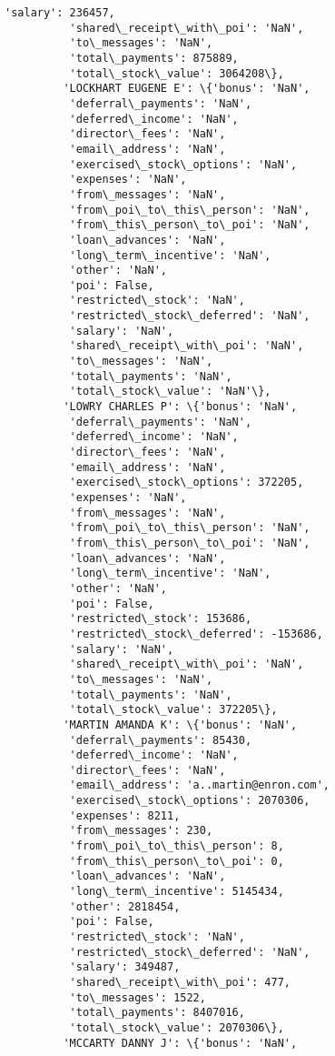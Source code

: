 \documentclass[11pt]{article}
\begin{document}
\begin{Verbatim}[commandchars=\\\{\}]
          'salary': 236457,
          'shared\_receipt\_with\_poi': 'NaN',
          'to\_messages': 'NaN',
          'total\_payments': 875889,
          'total\_stock\_value': 3064208\},
         'LOCKHART EUGENE E': \{'bonus': 'NaN',
          'deferral\_payments': 'NaN',
          'deferred\_income': 'NaN',
          'director\_fees': 'NaN',
          'email\_address': 'NaN',
          'exercised\_stock\_options': 'NaN',
          'expenses': 'NaN',
          'from\_messages': 'NaN',
          'from\_poi\_to\_this\_person': 'NaN',
          'from\_this\_person\_to\_poi': 'NaN',
          'loan\_advances': 'NaN',
          'long\_term\_incentive': 'NaN',
          'other': 'NaN',
          'poi': False,
          'restricted\_stock': 'NaN',
          'restricted\_stock\_deferred': 'NaN',
          'salary': 'NaN',
          'shared\_receipt\_with\_poi': 'NaN',
          'to\_messages': 'NaN',
          'total\_payments': 'NaN',
          'total\_stock\_value': 'NaN'\},
         'LOWRY CHARLES P': \{'bonus': 'NaN',
          'deferral\_payments': 'NaN',
          'deferred\_income': 'NaN',
          'director\_fees': 'NaN',
          'email\_address': 'NaN',
          'exercised\_stock\_options': 372205,
          'expenses': 'NaN',
          'from\_messages': 'NaN',
          'from\_poi\_to\_this\_person': 'NaN',
          'from\_this\_person\_to\_poi': 'NaN',
          'loan\_advances': 'NaN',
          'long\_term\_incentive': 'NaN',
          'other': 'NaN',
          'poi': False,
          'restricted\_stock': 153686,
          'restricted\_stock\_deferred': -153686,
          'salary': 'NaN',
          'shared\_receipt\_with\_poi': 'NaN',
          'to\_messages': 'NaN',
          'total\_payments': 'NaN',
          'total\_stock\_value': 372205\},
         'MARTIN AMANDA K': \{'bonus': 'NaN',
          'deferral\_payments': 85430,
          'deferred\_income': 'NaN',
          'director\_fees': 'NaN',
          'email\_address': 'a..martin@enron.com',
          'exercised\_stock\_options': 2070306,
          'expenses': 8211,
          'from\_messages': 230,
          'from\_poi\_to\_this\_person': 8,
          'from\_this\_person\_to\_poi': 0,
          'loan\_advances': 'NaN',
          'long\_term\_incentive': 5145434,
          'other': 2818454,
          'poi': False,
          'restricted\_stock': 'NaN',
          'restricted\_stock\_deferred': 'NaN',
          'salary': 349487,
          'shared\_receipt\_with\_poi': 477,
          'to\_messages': 1522,
          'total\_payments': 8407016,
          'total\_stock\_value': 2070306\},
         'MCCARTY DANNY J': \{'bonus': 'NaN',

\end{Verbatim}
\end{document}
